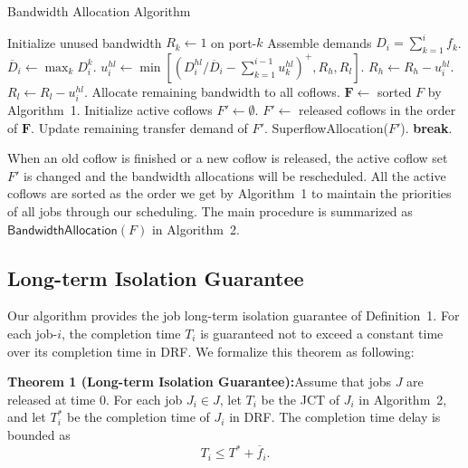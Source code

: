 \documentclass[10pt, conference, letterpaper]{IEEEtran}
\begin{document}
\begin{algorithm}
	\caption{Bandwidth Allocation Algorithm}
	\begin{algorithmic}[1]
			\State Initialize unused bandwidth $R_k \gets 1$ on port-$k$
				\State Assemble demands $D_i = \sum_{k=1}^if_k$.
				\State $\overline{D}_i \gets \max_kD_i^k$.
					\State $u_i^{hl} \gets \min[(D_i^{hl}/\overline{D}_i - \sum_{k=1}^{i-1}u_k^{hl})^+, R_h,R_l]$.
					\State $R_h \gets R_h - u_i^{hl}$.
					\State $R_l \gets R_l - u_i^{hl}$.
				\EndFor
			\EndFor
			\State Allocate remaining bandwidth to all coflows.%
		\EndProcedure
			\State $\mathbf{F} \gets$ sorted $F$ by Algorithm~1.
			\State Initialize active coflows $F' \gets \emptyset$.
				\State $F' \gets$ released coflows in the order of $\mathbf{F}$.
					\State Update remaining transfer demand of $F'$.
					\State SuperflowAllocation($F'$).
				\EndIf
					\State \textbf{break}.
				\EndIf
			\EndWhile
		\EndProcedure
	\end{algorithmic}
\end{algorithm}

When an old coflow is finished or a new coflow is released, the active coflow set $F'$ is changed and the bandwidth allocations will be rescheduled. All the active coflows are sorted as the order we get by Algorithm~1 to maintain the priorities of all jobs through our scheduling. The main procedure is summarized as $\mathsf{BandwidthAllocation}(F)$ in Algorithm~2.

\subsection{Long-term Isolation Guarantee}
Our algorithm provides the job long-term isolation guarantee of Definition~1. For each job-$i$, the completion time $T_i$ is guaranteed not to exceed a constant time over its completion time in DRF. We formalize this theorem as following:

\textbf{Theorem 1 (Long-term Isolation Guarantee):}Assume that jobs $J$ are released at time 0. For each job $J_i \in J$, let $T_i$ be the JCT of $J_i$ in Algorithm~2, and let $T_i^*$ be the completion time of $J_i$ in DRF. The completion time delay is bounded as
\begin{equation}
	T_i \leq T^* + \overline{f}_i.
\end{equation}
\end{document}
